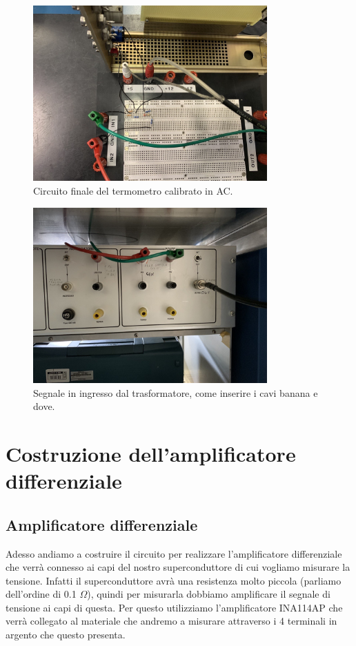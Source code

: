 \documentclass[../main/main.tex]{subfiles}
\begin{document}
\begin{figure}[h!]
\centering
\includegraphics[width=0.8\textwidth]{../lessons/image/03/2.png}
\caption{\label{fig:3_2} Circuito finale del termometro calibrato in AC.}
\end{figure}

\begin{figure}[h!]
\centering
\includegraphics[width=0.8\textwidth]{../lessons/image/03/1.png}
\caption{\label{fig:3_1} Segnale in ingresso dal trasformatore, come inserire i cavi banana e dove.}
\end{figure}


\chapter{Costruzione dell'amplificatore differenziale}

\section{Amplificatore differenziale}
Adesso andiamo a costruire il circuito per realizzare l'amplificatore differenziale che verrà connesso ai capi del nostro superconduttore di cui vogliamo misurare la tensione. Infatti il superconduttore avrà una resistenza molto piccola (parliamo dell'ordine di 0.1 \( \Omega  \)), quindi per misurarla dobbiamo amplificare il segnale di tensione ai capi di questa. Per questo utilizziamo l'amplificatore INA114AP che verrà collegato al materiale che andremo a misurare attraverso i 4 terminali in argento che questo presenta.
\end{document}

